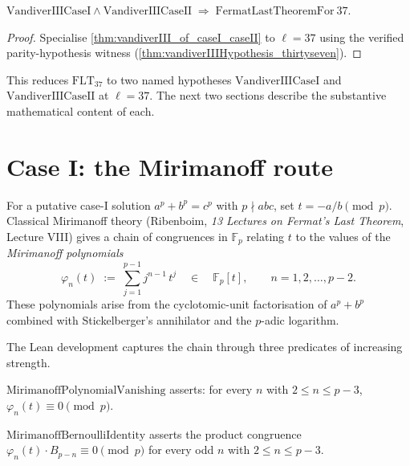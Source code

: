 \begin{theorem}
  \label{thm:fermatLastTheoremFor_thirtyseven_of_caseI_caseII}
  \leanok
  $\mathrm{VandiverIIICaseI} \land \mathrm{VandiverIIICaseII}
    \;\Longrightarrow\; \mathrm{FermatLastTheoremFor}\ 37$.
\end{theorem}

\begin{proof}\leanok
  Specialise \cref{thm:vandiverIII_of_caseI_caseII} to $\ell = 37$ using the
  verified parity-hypothesis witness
  (\cref{thm:vandiverIIIHypothesis_thirtyseven}).
\end{proof}

This reduces $\mathrm{FLT}_{37}$ to two named hypotheses
$\mathrm{VandiverIIICaseI}$ and $\mathrm{VandiverIIICaseII}$ at $\ell = 37$.
The next two sections describe the substantive mathematical content of each.

\section{Case I: the Mirimanoff route}

For a putative case-I solution $a^p + b^p = c^p$ with $p \nmid abc$, set
$t = -a / b \pmod p$.  Classical Mirimanoff theory (Ribenboim, \emph{13
Lectures on Fermat's Last Theorem}, Lecture VIII) gives a chain of
congruences in $\mathbb{F}_p$ relating $t$ to the values of the
\emph{Mirimanoff polynomials}
\[
  \varphi_n(t) \;:=\; \sum_{j=1}^{p-1} j^{n-1}\, t^j \quad\in\quad
    \mathbb F_p[t],
  \qquad n = 1, 2, \ldots, p-2.
\]
These polynomials arise from the cyclotomic-unit factorisation of
$a^p + b^p$ combined with Stickelberger's annihilator and the
$p$-adic logarithm.

The Lean development captures the chain through three predicates of
increasing strength.

\begin{definition}
  \label{def:mirimanoffPolynomialVanishing}
  \leanok
  $\mathrm{MirimanoffPolynomialVanishing}$ asserts: for every $n$ with
  $2 \le n \le p - 3$, $\varphi_n(t) \equiv 0 \pmod p$.
\end{definition}

\begin{definition}
  \label{def:mirimanoffBernoulliIdentity}
  \leanok
  $\mathrm{MirimanoffBernoulliIdentity}$ asserts the product congruence
  $\varphi_n(t) \cdot B_{p-n} \equiv 0 \pmod p$ for every odd $n$ with
  $2 \le n \le p - 3$.
\end{definition}

